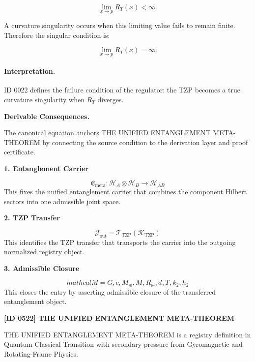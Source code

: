 \begin{equation}
\lim_{x\to p}R_T(x)<\infty .
\end{equation}

A curvature singularity occurs when this limiting value fails to remain finite. Therefore the singular condition is:

\begin{equation}
\boxed{
\lim_{x\to p}R_T(x)=\infty .
}
\end{equation}

\paragraph{Interpretation.}
ID 0022 defines the failure condition of the regulator: the TZP becomes a true curvature singularity when $R_T$ diverges.

\par\vspace{0.35em}
\noindent\textbf{Derivable Consequences.}\quad
\begingroup
\footnotesize
\raggedright
The canonical equation anchors THE UNIFIED ENTANGLEMENT META-THEOREM by connecting the source condition to the derivation layer and proof certificate.
\par\endgroup

\noindent\textbf{1. Entanglement Carrier}\par
\[
\mathfrak{E}_{\mathrm{meta}}:\mathcal{H}_A\otimes\mathcal{H}_B\longrightarrow \mathcal{H}_{AB}
\]
\noindent This fixes the unified entanglement carrier that combines the component Hilbert sectors into one admissible joint space.\par
\noindent\textbf{2. TZP Transfer}\par
\[
\mathcal{J}_{\mathrm{out}}=\mathcal{T}_{\mathrm{TZP}}\!\left(\mathcal{K}_{\mathrm{TZP}}\right)
\]
\noindent This identifies the TZP transfer that transports the carrier into the outgoing normalized registry object.\par
\noindent\textbf{3. Admissible Closure}\par
\[
mathcal{M} = {G, c, M_{\oplus}, M_{\text{}}, R_{\oplus}, d_{\text{}}, T_{\text{}}, k_2, h_2}
\]
\noindent This closes the entry by asserting admissible closure of the transferred entanglement object.\par

\clearpage
\noindent\textbf{[ID 0522] THE UNIFIED ENTANGLEMENT META-THEOREM}\par
\vspace{0.35em}
\begingroup\small
{}
THE UNIFIED ENTANGLEMENT META-THEOREM is a registry definition in Quantum-Classical Transition with secondary pressure from Gyromagnetic and Rotating-Frame Physics.

